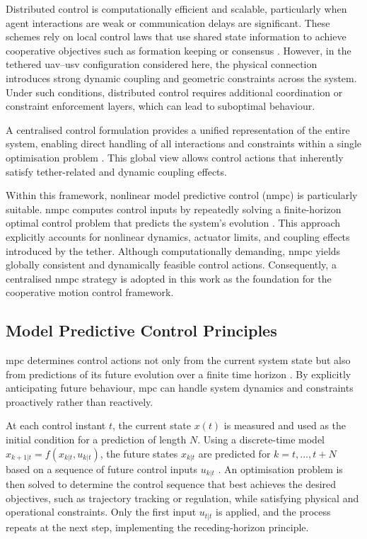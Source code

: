 Distributed control is computationally efficient and scalable, particularly when agent interactions are weak or communication delays are significant. These schemes rely on local control laws that use shared state information to achieve cooperative objectives such as formation keeping or consensus \citep{caoOverviewRecentProgress2013,olfati-saberConsensusCooperationNetworked2007}. However, in the tethered \gls{uav}--\gls{usv} configuration considered here, the physical connection introduces strong dynamic coupling and geometric constraints across the system. Under such conditions, distributed control requires additional coordination or constraint enforcement layers, which can lead to suboptimal behaviour.

A centralised control formulation provides a unified representation of the entire system, enabling direct handling of all interactions and constraints within a single optimisation problem \citep{zhangCooperativeControlFramework2025,novakCollaborativeObjectManipulation2024}. This global view allows control actions that inherently satisfy tether-related and dynamic coupling effects.

Within this framework, nonlinear model predictive control (\gls{nmpc}) is particularly suitable. \gls{nmpc} computes control inputs by repeatedly solving a finite-horizon optimal control problem that predicts the system’s evolution \citep{rawlingsModelPredictiveControl2020,gruneNonlinearModelPredictive2011}. This approach explicitly accounts for nonlinear dynamics, actuator limits, and coupling effects introduced by the tether. Although computationally demanding, \gls{nmpc} yields globally consistent and dynamically feasible control actions. Consequently, a centralised \gls{nmpc} strategy is adopted in this work as the foundation for the cooperative motion control framework.


\subsection{Model Predictive Control Principles}
\label{subsec:mpc_principles}

\gls{mpc} determines control actions not only from the current system state but also from predictions of its future evolution over a finite time horizon \citep{rawlingsModelPredictiveControl2020,camachoModelPredictiveControl2007}. By explicitly anticipating future behaviour, \gls{mpc} can handle system dynamics and constraints proactively rather than reactively.

At each control instant \(t\), the current state \(x(t)\) is measured and used as the initial condition for a prediction of length \(N\). Using a discrete-time model \(x_{k+1|t} = f(x_{k|t}, u_{k|t})\), the future states \(x_{k|t}\) are predicted for \(k = t, \dots, t+N\) based on a sequence of future control inputs \(u_{k|t}\) \citep{mayneConstrainedModelPredictive2000}. An optimisation problem is then solved to determine the control sequence that best achieves the desired objectives, such as trajectory tracking or regulation, while satisfying physical and operational constraints. Only the first input \(u_{t|t}\) is applied, and the process repeats at the next step, implementing the receding-horizon principle.

